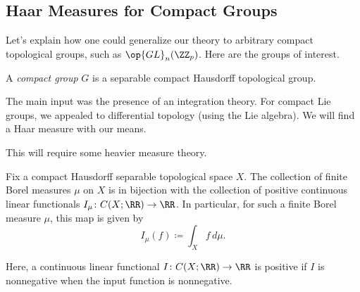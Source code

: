 \documentclass[../notes.tex]{subfiles}
\begin{document}
\subsection{Haar Measures for Compact Groups}
Let's explain how one could generalize our theory to arbitrary compact topological groups, such as $\op{GL}_n(\ZZ_p)$. Here are the groups of interest.
\begin{definition}[compact]
	A \textit{compact group} $G$ is a separable compact Hausdorff topological group.
\end{definition}
The main input was the presence of an integration theory. For compact Lie groups, we appealed to differential topology (using the Lie algebra). We will find a Haar measure with our means.

This will require some heavier measure theory.
\begin{theorem} \label{thm:functional-to-measure}
	Fix a compact Hausdorff separable topological space $X$. The collection of finite Borel measures $\mu$ on $X$ is in bijection with the collection of positive continuous linear functionals $I_\mu\colon C(X;\RR)\to\RR$. In particular, for such a finite Borel measure $\mu$, this map is given by
	\[I_\mu(f)\coloneqq\int_Xf\,d\mu.\]
\end{theorem}
Here, a continuous linear functional $I\colon C(X;\RR)\to\RR$ is positive if $I$ is nonnegative when the input function is nonnegative.
\end{document}
